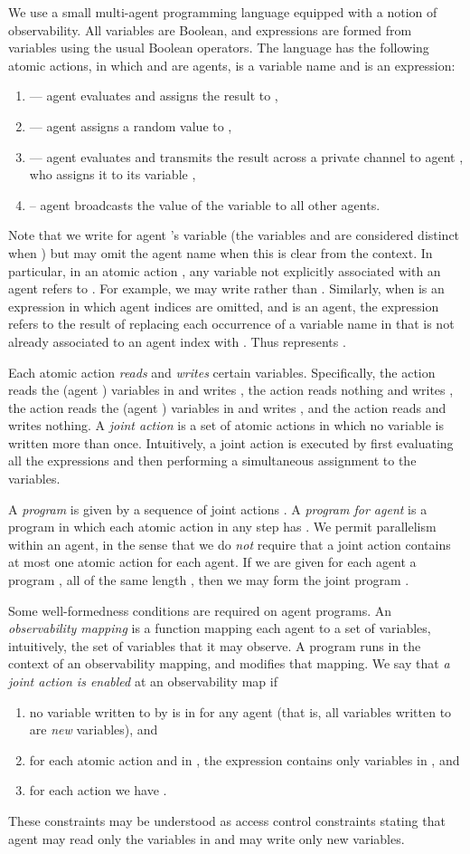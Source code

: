\documentclass[]{llncs}
\newcommand{\be}{\begin{enumerate}}
\newcommand{\ee}{\end{enumerate}}
\begin{document}
We use a small multi-agent programming language equipped with a notion of observability. 
All variables are Boolean,  and expressions are formed from variables  using the usual Boolean operators. 
The language has the following 
atomic actions, 
in which  and  are  agents,   is a variable name and  is an expression: 
\be 
\item   ---  agent  evaluates  and assigns the result to , 
\item  --- agent  assigns a random value to ,  
\item  --- agent  evaluates  and transmits the result across a private channel  to agent , 
 who assigns it to its variable , 
 \item  --  agent  broadcasts the value of the variable  to all other agents. 
\ee
Note that we write  for agent 's variable  (the variables  and  are considered distinct when )
but may omit the agent name when this is clear from the context.   In particular,  in
an atomic action , any variable  not explicitly associated with an agent
refers to . For example, we may write  rather than . 
Similarly, when  is an expression in which agent indices are omitted, and  is an agent, 
the expression  refers to the result of replacing each occurrence of a variable name  in  
that is not already associated to an agent index 
with . Thus  represents  . 


 Each atomic action {\em reads}  and {\em writes}  certain variables. 
 Specifically, the action   reads the (agent ) variables in  and writes , the action 
 reads nothing and writes , the action 
 reads the (agent ) variables in  and writes , and the action 
 reads   and writes nothing. 
A {\em  joint action} is  a set of atomic actions in which no variable is 
written more than once.   Intuitively,  a joint action is executed by first evaluating all the expressions and then performing a  simultaneous
assignment  to the variables. 

A {\em program}  is given by a sequence of joint actions
. 
A {\em program for agent } is a program in which  each atomic action  in any step 
has . We permit parallelism within an agent, in the sense that we do {\em not} require that 
a joint action contains at most one atomic action for each agent. 
If we are given for each agent  a program , all of the same
length , then we may form the joint program . 

Some well-formedness conditions are required on agent programs. 
An {\em observability mapping} is a function   mapping each agent 
to a set of variables, intuitively, the set of variables that it may observe. 
A program runs in the context of an observability mapping, and modifies that 
mapping. We say that {\em a joint action  is  enabled} at an observability 
map  if 
\be 
\item no variable written to by  is in   for any agent 
(that is, all variables written to are 
{\em new} variables), and 
\item for each atomic action  and  in , 
the expression  contains only variables in , and 
\item for each action  we have . 
\ee 
These constraints may be understood as access control constraints stating that 
agent  may read only the variables in  and may write only new variables. 
\end{document}
